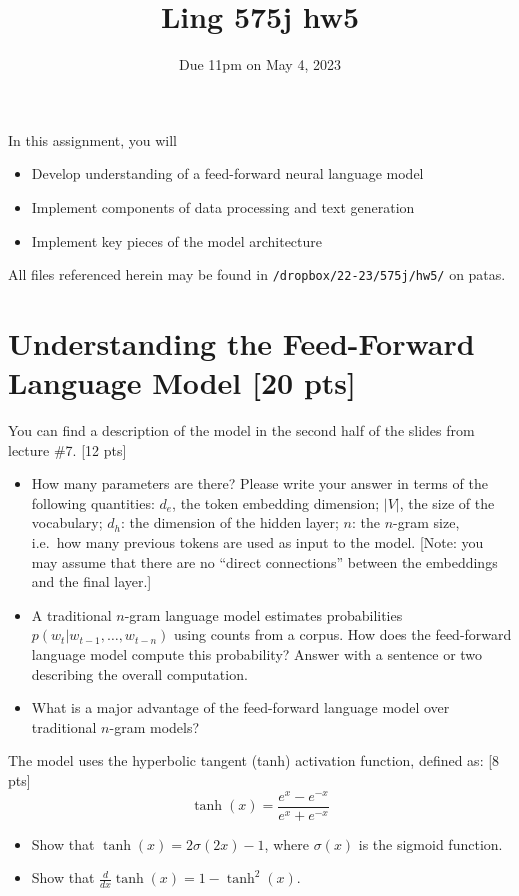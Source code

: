 \documentclass[11pt]{article}
\begin{document}
\title{Ling 575j hw5}
\date{\vspace{-0.2in}Due 11pm on May 4, 2023}
\maketitle


\noindent In this assignment, you will 
\begin{itemize}
  \item Develop understanding of a feed-forward neural language model
  \item Implement components of data processing and text generation
  \item Implement key pieces of the model architecture
\end{itemize}
All files referenced herein may be found in \texttt{/dropbox/22-23/575j/hw5/} on patas.


\section{Understanding the Feed-Forward Language Model [20 pts]}

  You can find a description of the model in the second half of the slides from lecture \#7. \hfill [12 pts]
\begin{itemize}
  \item How many parameters are there?  Please write your answer in terms of the following quantities: $d_e$, the token embedding dimension; $|V|$, the size of the vocabulary; $d_h$: the dimension of the hidden layer; $n$: the $n$-gram size, i.e.\ how many previous tokens are used as input to the model.  [Note: you may assume that there are no ``direct connections'' between the embeddings and the final layer.]
  \item A traditional $n$-gram language model estimates probabilities $p(w_t | w_{t-1} , \dots , w_{t-n})$ using counts from a corpus.  How does the feed-forward language model compute this probability?  Answer with a sentence or two describing the overall computation.
  \item What is a major advantage of the feed-forward language model over traditional $n$-gram models?
\end{itemize}


\vspace{2em}
 The model uses the hyperbolic tangent (tanh) activation function, defined as: \hfill [8 pts]
\[ \tanh(x) = \frac{e^x - e^{-x}}{e^x + e^{-x}} \]
\begin{itemize}
  \item Show that $\tanh(x) = 2\sigma(2x) - 1$, where $\sigma(x)$ is the sigmoid function.
  \item Show that $\frac{d}{dx}\tanh(x) = 1 - \tanh^2(x)$.
\end{itemize}
\end{document}
